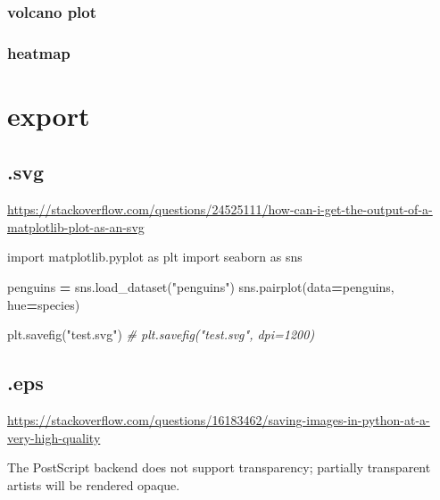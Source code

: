 \documentclass[
]{book}
\newenvironment{Shaded}{\begin{snugshade}}{\end{snugshade}}
\newcommand{\CommentTok}[1]{\textcolor[rgb]{0.56,0.35,0.01}{\textit{#1}}}
\newcommand{\ImportTok}[1]{#1}
\newcommand{\NormalTok}[1]{#1}
\newcommand{\OperatorTok}[1]{\textcolor[rgb]{0.81,0.36,0.00}{\textbf{#1}}}
\newcommand{\StringTok}[1]{\textcolor[rgb]{0.31,0.60,0.02}{#1}}
\theoremstyle{definition}
\theoremstyle{definition}
\theoremstyle{definition}
\theoremstyle{definition}
\theoremstyle{remark}
\begin{document}
\subsubsection{volcano plot}\label{volcano-plot}

\subsubsection{heatmap}\label{heatmap}

\section{export}\label{export}

\subsection{.svg}\label{svg-1}

\url{https://stackoverflow.com/questions/24525111/how-can-i-get-the-output-of-a-matplotlib-plot-as-an-svg}

\begin{Shaded}
\begin{Highlighting}[]
\ImportTok{import}\NormalTok{ matplotlib.pyplot }\ImportTok{as}\NormalTok{ plt}
\ImportTok{import}\NormalTok{ seaborn }\ImportTok{as}\NormalTok{ sns}

\NormalTok{penguins }\OperatorTok{=}\NormalTok{ sns.load\_dataset(}\StringTok{"penguins"}\NormalTok{)}
\NormalTok{sns.pairplot(data}\OperatorTok{=}\NormalTok{penguins,}
\NormalTok{             hue}\OperatorTok{=}\StringTok{\textquotesingle{}species\textquotesingle{}}\NormalTok{)}

\NormalTok{plt.savefig(}\StringTok{"test.svg"}\NormalTok{)}
\CommentTok{\# plt.savefig("test.svg", dpi=1200)}
\end{Highlighting}
\end{Shaded}

\subsection{.eps}\label{eps}

\url{https://stackoverflow.com/questions/16183462/saving-images-in-python-at-a-very-high-quality}

The PostScript backend does not support transparency; partially transparent artists will be rendered opaque.
\end{document}
